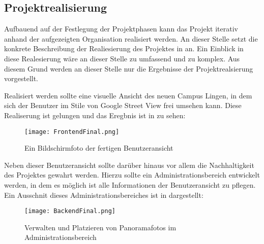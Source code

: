 \subsection{Projektrealisierung}
\label{sec:Projektrealisierung}

Aufbauend auf der Festlegung der Projektphasen kann das Projekt iterativ anhand der aufgezeigten Organisation
realisiert werden. An dieser Stelle setzt die konkrete Beschreibung der Realiesierung des
Projektes in \citet{modelierungUndBetrieb2014} an.
Ein Einblick in diese Realesierung wäre an dieser Stelle zu umfassend und zu komplex. Aus diesem Grund werden an dieser
Stelle nur die Ergebnisse der Projektrealsierung vorgestellt.

Realisiert werden sollte eine visuelle Ansicht des neuen Campus Lingen, in dem sich der Benutzer im Stile von Google
Street View frei umsehen kann. Diese Realiserung ist gelungen und das Eregbnis ist in 
zu sehen:

\clearpage

\begin{figure}[htb] 
\centering
\texttt{[image: FrontendFinal.png]}
\caption[Abbildung der Benutzeransicht]{Ein Bildschirmfoto der fertigen Benutzeransicht\protect}
\label{fig:FrontendFinal}
\end{figure}

Neben dieser Benutzeransicht sollte darüber hinaus vor allem die Nachhaltigkeit des Projektes gewahrt werden.
Hierzu sollte ein Administrationsbereich entwickelt werden, in dem es möglich ist alle Informationen
der Benutzeransicht zu pflegen. Ein Ausschnit dieses Administrationsbereiches ist 
in  dargestellt:

\begin{figure}[htb] 
\centering
\texttt{[image: BackendFinal.png]}
\caption[Ausschnitt des Administrationsbereiches]{Verwalten und Platzieren von Panoramafotos im Administrationsbereich\protect}
\label{fig:BackendFinal}
\end{figure}